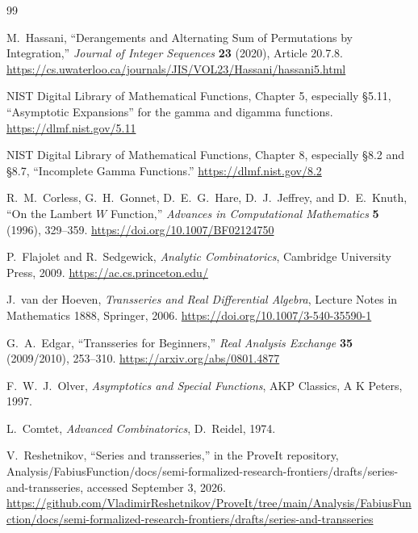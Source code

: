 \documentclass[11pt]{article}
\numberwithin{equation}{section}
\theoremstyle{mainthm}
\theoremstyle{defstyle}
\theoremstyle{remark}
\begin{document}
\begin{thebibliography}{99}

M.~Hassani,
``Derangements and Alternating Sum of Permutations by Integration,''
\emph{Journal of Integer Sequences} \textbf{23} (2020), Article 20.7.8.
\url{https://cs.uwaterloo.ca/journals/JIS/VOL23/Hassani/hassani5.html}

NIST Digital Library of Mathematical Functions,
Chapter 5, especially \S5.11, ``Asymptotic Expansions'' for the gamma and digamma functions.
\url{https://dlmf.nist.gov/5.11}

NIST Digital Library of Mathematical Functions,
Chapter 8, especially \S8.2 and \S8.7, ``Incomplete Gamma Functions.''
\url{https://dlmf.nist.gov/8.2}

R.~M.~Corless, G.~H.~Gonnet, D.~E.~G.~Hare, D.~J.~Jeffrey, and D.~E.~Knuth,
``On the Lambert \(W\) Function,''
\emph{Advances in Computational Mathematics} \textbf{5} (1996), 329--359.
\url{https://doi.org/10.1007/BF02124750}

P.~Flajolet and R.~Sedgewick,
\emph{Analytic Combinatorics},
Cambridge University Press, 2009.
\url{https://ac.cs.princeton.edu/}

J.~van der Hoeven,
\emph{Transseries and Real Differential Algebra},
Lecture Notes in Mathematics 1888, Springer, 2006.
\url{https://doi.org/10.1007/3-540-35590-1}

G.~A.~Edgar,
``Transseries for Beginners,''
\emph{Real Analysis Exchange} \textbf{35} (2009/2010), 253--310.
\url{https://arxiv.org/abs/0801.4877}

F.~W.~J.~Olver,
\emph{Asymptotics and Special Functions},
AKP Classics, A K Peters, 1997.

L.~Comtet,
\emph{Advanced Combinatorics},
D.~Reidel, 1974.

V.~Reshetnikov,
``Series and transseries,'' in the ProveIt repository,
Analysis/FabiusFunction/docs/semi-formalized-research-frontiers/drafts/series-and-transseries,
accessed September 3, 2026.
\url{https://github.com/VladimirReshetnikov/ProveIt/tree/main/Analysis/FabiusFunction/docs/semi-formalized-research-frontiers/drafts/series-and-transseries}

\end{thebibliography}
\end{document}

